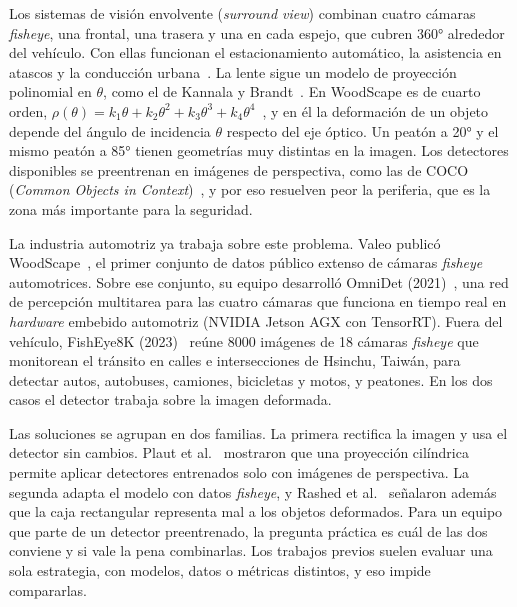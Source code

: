 \documentclass[conference]{IEEEtran}
\begin{document}
Los sistemas de visión envolvente (\textit{surround view}) combinan cuatro cámaras \textit{fisheye}, una frontal, una trasera y una en cada espejo, que cubren 360° alrededor del vehículo. Con ellas funcionan el estacionamiento automático, la asistencia en atascos y la conducción urbana~\cite{kumar2023survey}. La lente sigue un modelo de proyección polinomial en $\theta$, como el de Kannala y Brandt~\cite{kannala2006}. En WoodScape es de cuarto orden, $\rho(\theta)=k_1\theta+k_2\theta^2+k_3\theta^3+k_4\theta^4$~\cite{yogamani2019woodscape}, y en él la deformación de un objeto depende del ángulo de incidencia $\theta$ respecto del eje óptico. Un peatón a 20° y el mismo peatón a 85° tienen geometrías muy distintas en la imagen. Los detectores disponibles se preentrenan en imágenes de perspectiva, como las de COCO (\textit{Common Objects in Context})~\cite{lin2014coco}, y por eso resuelven peor la periferia, que es la zona más importante para la seguridad.

La industria automotriz ya trabaja sobre este problema. Valeo publicó WoodScape~\cite{yogamani2019woodscape}, el primer conjunto de datos público extenso de cámaras \textit{fisheye} automotrices. Sobre ese conjunto, su equipo desarrolló OmniDet (2021)~\cite{kumar2021omnidet}, una red de percepción multitarea para las cuatro cámaras que funciona en tiempo real en \textit{hardware} embebido automotriz (NVIDIA Jetson AGX con TensorRT). Fuera del vehículo, FishEye8K (2023)~\cite{gochoo2023fisheye8k} reúne 8000 imágenes de 18 cámaras \textit{fisheye} que monitorean el tránsito en calles e intersecciones de Hsinchu, Taiwán, para detectar autos, autobuses, camiones, bicicletas y motos, y peatones. En los dos casos el detector trabaja sobre la imagen deformada.

Las soluciones se agrupan en dos familias. La primera rectifica la imagen y usa el detector sin cambios. Plaut et al.~\cite{plaut2021cylindrical} mostraron que una proyección cilíndrica permite aplicar detectores entrenados solo con imágenes de perspectiva. La segunda adapta el modelo con datos \textit{fisheye}, y Rashed et al.~\cite{rashed2021generalized} señalaron además que la caja rectangular representa mal a los objetos deformados. Para un equipo que parte de un detector preentrenado, la pregunta práctica es cuál de las dos conviene y si vale la pena combinarlas. Los trabajos previos suelen evaluar una sola estrategia, con modelos, datos o métricas distintos, y eso impide compararlas.
\end{document}
